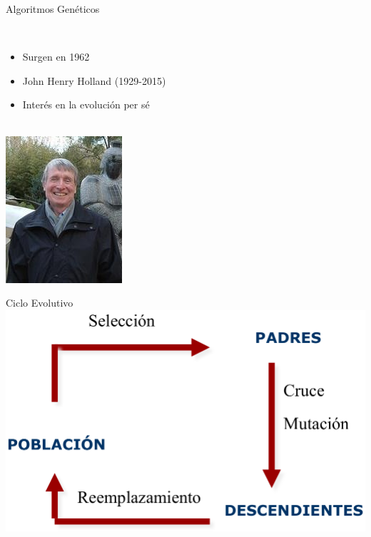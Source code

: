 \documentclass[10pt]{beamer}
\begin{document}
\begin{frame}[fragile]{Algoritmos Genéticos}
  \begin{multicols}{2}
    ~\\
    \begin{itemize}
    \item Surgen en 1962
    \item John Henry Holland (1929-2015)
    \item Interés en la evolución per sé
    \end{itemize}
    ~\\
    \includegraphics[scale=.7]{imgs/Holland}
  \end{multicols}
\end{frame}


\begin{frame}[fragile]{Ciclo Evolutivo}
    \includegraphics[scale=.28]{imgs/ciclo_evolucion}
\end{frame}
\end{document}
